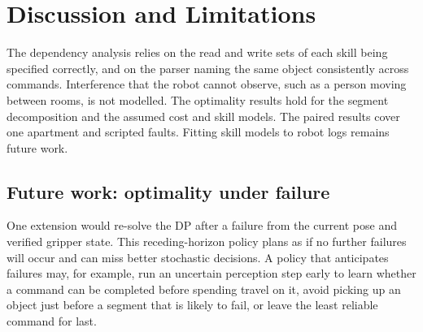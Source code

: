 \documentclass[conference]{IEEEtran}
\newcommand{\todo}[1]{}
\newcommand{\todo}[1]{\textcolor{red}{[TODO: #1]}}
\begin{document}
\section{Discussion and Limitations}
The dependency analysis relies on the read and write sets of each skill being
specified correctly, and on the parser naming the same object consistently
across commands. Interference that the robot cannot observe, such as a person
moving between rooms, is not modelled. The optimality results hold for the
segment decomposition and the assumed cost and skill models. The paired
results cover one apartment and scripted faults. Fitting skill models to
robot logs remains future work.
\todo{Expand after results and discuss whether the operator should be
consulted when commands conflict.}

\subsection{Future work: optimality under failure}\label{sec:mdp}
One extension would re-solve the DP after a failure from the current pose
and verified gripper state. This receding-horizon policy plans as if no
further failures will occur and can miss better stochastic decisions.
A policy that anticipates failures may, for example, run an uncertain
perception step early to learn whether a command can be completed before
spending travel on it, avoid picking up an object just before a segment that
is likely to fail, or leave the least reliable command for last.
\end{document}
